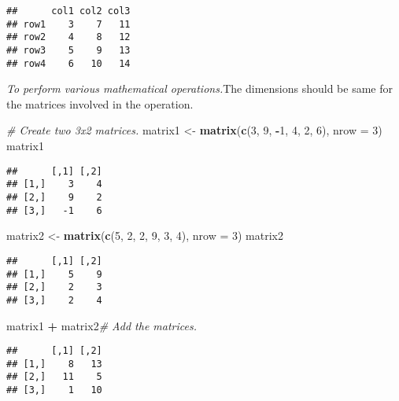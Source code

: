 \documentclass[]{book}
\newenvironment{Shaded}{\begin{snugshade}}{\end{snugshade}}
\newcommand{\KeywordTok}[1]{\textcolor[rgb]{0.13,0.29,0.53}{\textbf{#1}}}
\newcommand{\DataTypeTok}[1]{\textcolor[rgb]{0.13,0.29,0.53}{#1}}
\newcommand{\DecValTok}[1]{\textcolor[rgb]{0.00,0.00,0.81}{#1}}
\newcommand{\StringTok}[1]{\textcolor[rgb]{0.31,0.60,0.02}{#1}}
\newcommand{\CommentTok}[1]{\textcolor[rgb]{0.56,0.35,0.01}{\textit{#1}}}
\newcommand{\OperatorTok}[1]{\textcolor[rgb]{0.81,0.36,0.00}{\textbf{#1}}}
\newcommand{\NormalTok}[1]{#1}
\theoremstyle{definition}
\theoremstyle{definition}
\theoremstyle{definition}
\theoremstyle{remark}
\begin{document}
\begin{verbatim}
##      col1 col2 col3
## row1    3    7   11
## row2    4    8   12
## row3    5    9   13
## row4    6   10   14
\end{verbatim}

\emph{To perform various mathematical operations.}The dimensions should
be same for the matrices involved in the operation.

\begin{Shaded}
\begin{Highlighting}[]
\CommentTok{# Create two 3x2 matrices.}
\NormalTok{matrix1 <-}\StringTok{ }\KeywordTok{matrix}\NormalTok{(}\KeywordTok{c}\NormalTok{(}\DecValTok{3}\NormalTok{, }\DecValTok{9}\NormalTok{, }\OperatorTok{-}\DecValTok{1}\NormalTok{, }\DecValTok{4}\NormalTok{, }\DecValTok{2}\NormalTok{, }\DecValTok{6}\NormalTok{), }\DataTypeTok{nrow =} \DecValTok{3}\NormalTok{)}
\NormalTok{matrix1}
\end{Highlighting}
\end{Shaded}

\begin{verbatim}
##      [,1] [,2]
## [1,]    3    4
## [2,]    9    2
## [3,]   -1    6
\end{verbatim}

\begin{Shaded}
\begin{Highlighting}[]
\NormalTok{matrix2 <-}\StringTok{ }\KeywordTok{matrix}\NormalTok{(}\KeywordTok{c}\NormalTok{(}\DecValTok{5}\NormalTok{, }\DecValTok{2}\NormalTok{, }\DecValTok{2}\NormalTok{, }\DecValTok{9}\NormalTok{, }\DecValTok{3}\NormalTok{, }\DecValTok{4}\NormalTok{), }\DataTypeTok{nrow =} \DecValTok{3}\NormalTok{)}
\NormalTok{matrix2}
\end{Highlighting}
\end{Shaded}

\begin{verbatim}
##      [,1] [,2]
## [1,]    5    9
## [2,]    2    3
## [3,]    2    4
\end{verbatim}

\begin{Shaded}
\begin{Highlighting}[]
\NormalTok{matrix1 }\OperatorTok{+}\StringTok{ }\NormalTok{matrix2}\CommentTok{# Add the matrices.}
\end{Highlighting}
\end{Shaded}

\begin{verbatim}
##      [,1] [,2]
## [1,]    8   13
## [2,]   11    5
## [3,]    1   10
\end{verbatim}
\end{document}
